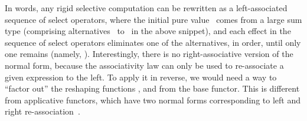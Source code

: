 \noindent
In words, any rigid selective computation can be rewritten as a left-associated
sequence of select operators, where the initial pure value~ comes from a
large sum type (comprising alternatives~ to~ in the above snippet),
and each effect in the sequence of select operators eliminates one of the
alternatives, in order, until only one remains (namely, ). Interestingly,
there is no right-associative version of the normal form, because the
associativity law can only be used to re-associate a given expression to the
left. To apply it in reverse, we would need a way to ``factor out'' the
reshaping functions ,  and  from the base functor. This is
different from applicative functors, which have two normal forms corresponding
to left and right re-association~\citep{free-applicatives}.

